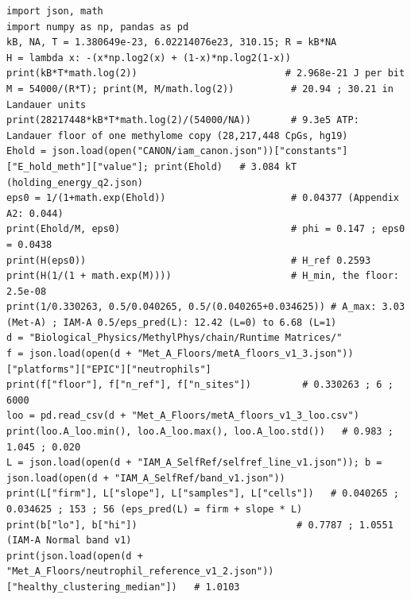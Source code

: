 \begin{Verbatim}[breaklines,breakanywhere,fontsize=\footnotesize]
import json, math
import numpy as np, pandas as pd
kB, NA, T = 1.380649e-23, 6.02214076e23, 310.15; R = kB*NA
H = lambda x: -(x*np.log2(x) + (1-x)*np.log2(1-x))
print(kB*T*math.log(2))                          # 2.968e-21 J per bit
M = 54000/(R*T); print(M, M/math.log(2))          # 20.94 ; 30.21 in Landauer units
print(28217448*kB*T*math.log(2)/(54000/NA))       # 9.3e5 ATP: Landauer floor of one methylome copy (28,217,448 CpGs, hg19)
Ehold = json.load(open("CANON/iam_canon.json"))["constants"]["E_hold_meth"]["value"]; print(Ehold)   # 3.084 kT (holding_energy_q2.json)
eps0 = 1/(1+math.exp(Ehold))                      # 0.04377 (Appendix A2: 0.044)
print(Ehold/M, eps0)                              # phi = 0.147 ; eps0 = 0.0438
print(H(eps0))                                    # H_ref 0.2593
print(H(1/(1 + math.exp(M))))                     # H_min, the floor: 2.5e-08
print(1/0.330263, 0.5/0.040265, 0.5/(0.040265+0.034625)) # A_max: 3.03 (Met-A) ; IAM-A 0.5/eps_pred(L): 12.42 (L=0) to 6.68 (L=1)
d = "Biological_Physics/MethylPhys/chain/Runtime Matrices/"
f = json.load(open(d + "Met_A_Floors/metA_floors_v1_3.json"))["platforms"]["EPIC"]["neutrophils"]
print(f["floor"], f["n_ref"], f["n_sites"])         # 0.330263 ; 6 ; 6000
loo = pd.read_csv(d + "Met_A_Floors/metA_floors_v1_3_loo.csv")
print(loo.A_loo.min(), loo.A_loo.max(), loo.A_loo.std())   # 0.983 ; 1.045 ; 0.020
L = json.load(open(d + "IAM_A_SelfRef/selfref_line_v1.json")); b = json.load(open(d + "IAM_A_SelfRef/band_v1.json"))
print(L["firm"], L["slope"], L["samples"], L["cells"])   # 0.040265 ; 0.034625 ; 153 ; 56 (eps_pred(L) = firm + slope * L)
print(b["lo"], b["hi"])                            # 0.7787 ; 1.0551 (IAM-A Normal band v1)
print(json.load(open(d + "Met_A_Floors/neutrophil_reference_v1_2.json"))["healthy_clustering_median"])   # 1.0103
\end{Verbatim}
